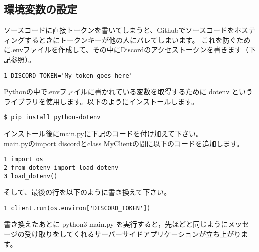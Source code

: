 \subsection{環境変数の設定}
ソースコードに直接トークンを書いてしまうと、Githubでソースコードをホスティングするときにトークンキーが他の人にバレてしまいます。
これを防ぐために.envファイルを作成して、その中にDiscordのアクセストークンを書きます（下記参照）。
\begin{tcolorbox}[breakable]
  \begin{verbatim}
1 DISCORD_TOKEN='My token goes here'
\end{verbatim}
\end{tcolorbox}
Pythonの中で.envファイルに書かれている変数を取得するために dotenv というライブラリを使用します。以下のようにインストールします。
\begin{shaded}
  \begin{verbatim}
$ pip install python-dotenv
\end{verbatim}
\end{shaded}
インストール後にmain.pyに下記のコードを付け加えて下さい。\\
main.pyのimport discordとclass MyClientの間に以下のコードを追加します。
\begin{tcolorbox}[breakable]
  \begin{verbatim}
1 import os
2 from dotenv import load_dotenv
3 load_dotenv()
\end{verbatim}
\end{tcolorbox}
そして、最後の行を以下のように書き換えて下さい。
\begin{tcolorbox}[breakable]
  \begin{verbatim}
1 client.run(os.environ['DISCORD_TOKEN'])
\end{verbatim}
\end{tcolorbox}
書き換えたあとに python3 main.py を実行すると，先ほどと同じようにメッセージの受け取りをしてくれるサーバーサイドアプリケーションが立ち上がります。

